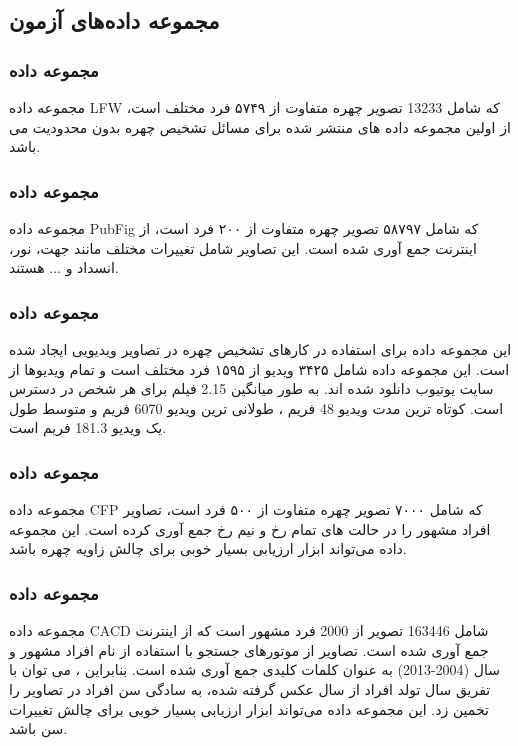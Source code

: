 \subsection{مجموعه داده‌های آزمون}
\subsubsection{مجموعه داده }
مجموعه داده LFW  که شامل 13233 تصویر چهره متفاوت از ۵۷۴۹ فرد مختلف است، از اولین مجموعه داده های منتشر شده برای مسائل تشخیص چهره بدون محدودیت می باشد. \cite{LFW_dataset}

\subsubsection{مجموعه داده }
مجموعه داده PubFig  که شامل ۵۸۷۹۷ تصویر چهره متفاوت از ۲۰۰ فرد است، از اینترنت جمع آوری شده است. این تصاویر شامل تغییرات مختلف مانند جهت، نور، انسداد و ... هستند. \cite{PubFig_dataset}

\subsubsection{مجموعه داده }
این مجموعه داده برای استفاده در کارهای تشخیص چهره در تصاویر ویدیویی ایجاد شده است. این مجموعه داده شامل ۳۴۲۵ ویدیو از ۱۵۹۵ فرد مختلف است و تمام ویدیوها از سایت یوتیوب دانلود شده اند. به طور میانگین 2.15 فیلم برای هر شخص در دسترس است. کوتاه ترین مدت ویدیو 48 فریم ، طولانی ترین ویدیو 6070 فریم و متوسط طول یک ویدیو 181.3 فریم است. \cite{VGGFace2_dataset}

\subsubsection{مجموعه داده }
مجموعه داده CFP  که شامل ۷۰۰۰ تصویر چهره متفاوت از ۵۰۰ فرد است، تصاویر افراد مشهور را در حالت های تمام رخ و نیم رخ جمع آوری کرده است. این مجموعه داده می‌تواند ابزار ارزیابی بسیار خوبی برای چالش زاویه چهره باشد. \cite{LFW_dataset}

\subsubsection{مجموعه داده }
مجموعه داده CACD  شامل 163446 تصویر از 2000 فرد مشهور است که از اینترنت جمع آوری شده است. تصاویر از موتورهای جستجو با استفاده از نام افراد مشهور و سال (2004-2013) به عنوان کلمات کلیدی جمع آوری شده است. بنابراین ، می توان با تفریق سال تولد افراد از سال عکس گرفته شده، به سادگی سن افراد در تصاویر را تخمین زد. این مجموعه داده می‌تواند ابزار ارزیابی بسیار خوبی برای چالش تغییرات سن باشد. \cite{CACD_dataset}

